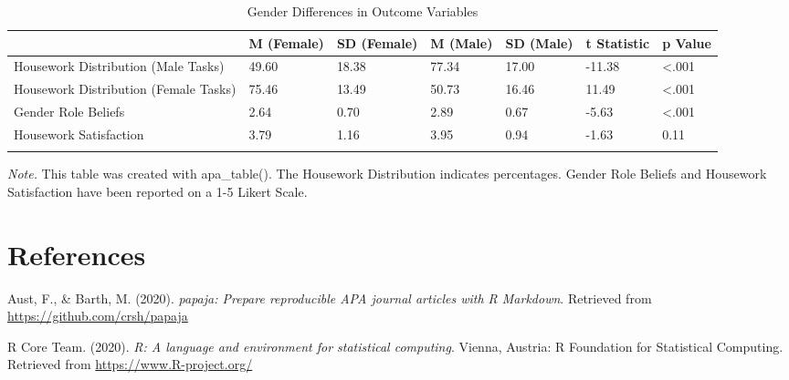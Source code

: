 \documentclass[
  man]{apa6}
\newlength{\cslhangindent}
\newlength{\cslentryspacingunit} %
\newenvironment{CSLReferences}[2] %
 {%
  \setlength{\parindent}{0pt}
  \ifodd #1
  \let\oldpar\par
  \def\par{\hangindent=\cslhangindent\oldpar}
  \fi
  \setlength{\parskip}{#2\cslentryspacingunit}
 }%
 {}
\begin{document}
\newpage

\begin{table}[tbp]

\begin{center}
\begin{threeparttable}

\caption{\label{tab:unnamed-chunk-46}Gender Differences in Outcome Variables}

\tiny{

\begin{tabular}{lllllll}
\toprule
 & \multicolumn{1}{c}{M (Female)} & \multicolumn{1}{c}{SD (Female)} & \multicolumn{1}{c}{M (Male)} & \multicolumn{1}{c}{SD (Male)} & \multicolumn{1}{c}{t Statistic} & \multicolumn{1}{c}{p Value}\\
\midrule
Housework Distribution (Male Tasks) & 49.60 & 18.38 & 77.34 & 17.00 & -11.38 & <.001\\
Housework Distribution (Female Tasks) & 75.46 & 13.49 & 50.73 & 16.46 & 11.49 & <.001\\
Gender Role Beliefs & 2.64 & 0.70 & 2.89 & 0.67 & -5.63 & <.001\\
Housework Satisfaction & 3.79 & 1.16 & 3.95 & 0.94 & -1.63 & 0.11\\
\bottomrule
\addlinespace
\end{tabular}

}

\begin{tablenotes}[para]
\normalsize{\textit{Note.} This table was created with apa\_table().  
  The Housework Distribution indicates percentages. Gender Role Beliefs and Housework Satisfaction have been reported on a 1-5 Likert Scale.}
\end{tablenotes}

\end{threeparttable}
\end{center}

\end{table}

\hypertarget{references}{%
\section{References}\label{references}}

\hypertarget{refs}{}
\begin{CSLReferences}{1}{0}
\leavevmode{}%
Aust, F., \& Barth, M. (2020). \emph{{papaja}: {Prepare} reproducible {APA} journal articles with {R Markdown}}. Retrieved from \url{https://github.com/crsh/papaja}

\leavevmode{}%
R Core Team. (2020). \emph{R: A language and environment for statistical computing}. Vienna, Austria: R Foundation for Statistical Computing. Retrieved from \url{https://www.R-project.org/}

\end{CSLReferences}


\clearpage
\renewcommand{\listtablename}{Table captions}
\end{document}
